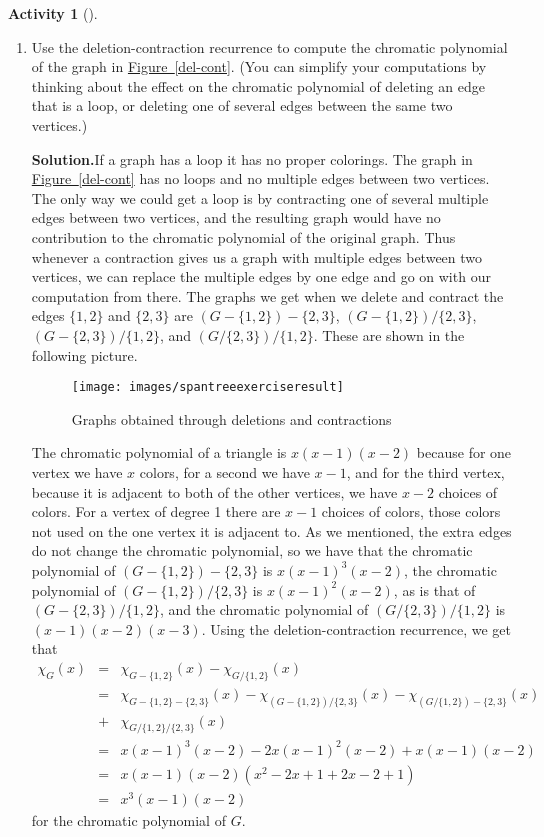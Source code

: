 \documentclass[10pt,]{book}
\theoremstyle{plain}
\theoremstyle{definition}
\newtheorem{activity}[project]{Activity}
\numberwithin{equation}{chapter}
\newcommand{\amp}{&}
\begin{document}
\begin{activity}[]
\begin{enumerate}[label=(\alph*)]
~\par
\item Use the deletion-contraction recurrence to compute the chromatic polynomial of the graph in \hyperref[del-cont]{Figure~\ref{del-cont}}. (You can simplify your computations by thinking about the effect on the chromatic polynomial of deleting an edge that is a loop, or deleting one of several edges between the same two vertices.)%
\par\medskip\noindent%
\textbf{Solution.}\quad If a graph has a loop it has no proper colorings. The graph in \hyperref[del-cont]{Figure~\ref{del-cont}} has no loops and no multiple edges between two vertices. The only way we could get a loop is by contracting one of several multiple edges between two vertices, and the resulting graph would have no contribution to the chromatic polynomial of the original graph. Thus whenever a contraction gives us a graph with multiple edges between two vertices, we can replace the multiple edges by one edge and go on with our computation from there. The graphs we get when we delete and contract the edges \(\{1,2\}\) and \(\{2,3\}\) are \((G-\{1,2\})-\{2,3\}\), \((G-\{1,2\})/\{2,3\}\), \((G-\{2,3\})/\{1,2\}\), and \((G/\{2,3\})/\{1,2\}\). These are shown in the following picture.%
\begin{figure}
\centering
\texttt{[image: images/spantreeexerciseresult]}
\caption{Graphs obtained through deletions and contractions\label{delete-contract}}
\end{figure}
The chromatic polynomial of a triangle is \(x(x-1)(x-2)\) because for one vertex we have \(x\) colors, for a second we have \(x-1\), and for the third vertex, because it is adjacent to both of the other vertices, we have \(x-2\) choices of colors. For a vertex of degree 1 there are \(x-1\) choices of colors, those colors not used on the one vertex it is adjacent to. As we mentioned, the extra edges do not change the chromatic polynomial, so we have that the chromatic polynomial of \((G-\{1,2\})-\{2,3\}\) is \(x(x-1)^3(x-2)\), the chromatic polynomial of \((G-\{1,2\})/\{2,3\}\) is \(x(x-1)^2(x-2)\), as is that of \((G-\{2,3\})/\{1,2\}\), and the chromatic polynomial of \((G/\{2,3\})/\{1,2\}\) is \((x-1)(x-2)(x-3)\). Using the deletion-contraction recurrence, we get that%
\begin{align*}
\chi_G(x) \amp =\amp  \chi_{G-\{1,2\}}(x) - \chi_{G/\{1,2\}}(x)\\
\amp =\amp
\chi_{G-\{1,2\}-\{2,3\}}(x)-\chi_{(G-\{1,2\})/\{2,3\}}(x)-
\chi_{(G/\{1,2\})-\{2,3\}}(x)\\
\amp +\amp  \chi_{G/\{1,2\}/\{2,3\}}(x)\\
\amp =\amp  x(x-1)^3(x-2)-2x(x-1)^2(x-2) + x(x-1)(x-2)\\
\amp =\amp  x(x-1)(x-2)(x^2-2x+1 +2x-2 +1)\\
\amp =\amp  x^3(x-1)(x-2)
\end{align*}
for the chromatic polynomial of \(G\).%


\end{enumerate}
\end{activity}
\end{document}
